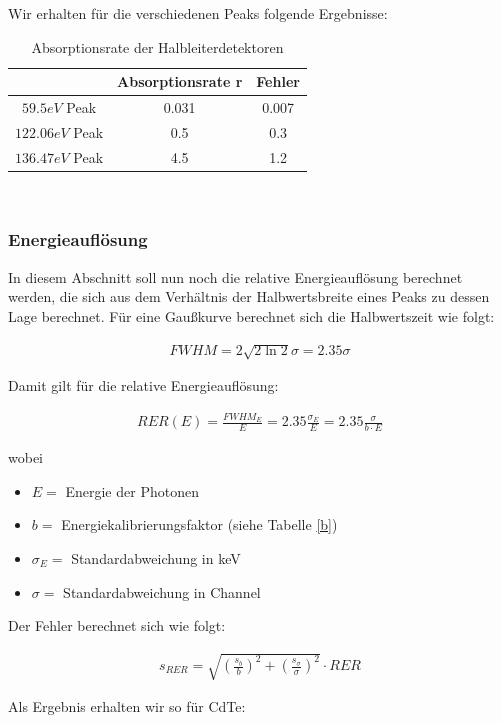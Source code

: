\documentclass[12pt]{article}
\begin{document}
Wir erhalten für die verschiedenen Peaks folgende Ergebnisse:
\begin{table}[h!]

{\centering{}
\begin{tabular}{c||c|c}
					& Absorptionsrate r & Fehler	\\ \hline\hline
$59.5 eV$ Peak		& 0.031			    & 0.007		\\ \hline
$122.06 eV$ Peak	& 0.5 			    & 0.3	\\ \hline
$136.47 eV$ Peak	& 4.5 		     	& 1.2
\end{tabular}\\}
 \caption{Absorptionsrate
  der Halbleiterdetektoren}
\end{table}
\subsubsection{Energieauflösung}
In diesem Abschnitt soll nun noch die relative Energieauflösung berechnet werden, die sich aus dem Verhältnis der Halbwertsbreite eines Peaks zu dessen Lage berechnet. Für eine Gaußkurve berechnet sich die Halbwertszeit wie folgt:

\begin{align*}
FWHM = 2\sqrt{2\ln2}\sigma = 2.35 \sigma
\end{align*}

Damit gilt für die relative Energieauflösung:

\begin{align*}
RER(E) = \frac{FWHM_E}{E}=2.35\frac{\sigma_E}{E} = 2.35\frac{\sigma}{b \cdot E}
\end{align*}

wobei 
\begin{itemize}
\item $E =$ Energie der Photonen
\item $b =$ Energiekalibrierungsfaktor (siehe Tabelle \ref{b})
\item $\sigma_E =$ Standardabweichung in keV
\item $\sigma =$  Standardabweichung in Channel 
\end{itemize}

Der Fehler berechnet sich wie folgt:

\begin{align*}
s_{RER} = \sqrt{\left(\frac{s_b}{b}\right)^2+\left(\frac{s_\sigma}{\sigma}\right)^2}\cdot RER
\end{align*}

Als Ergebnis erhalten wir so für CdTe:
\end{document}
